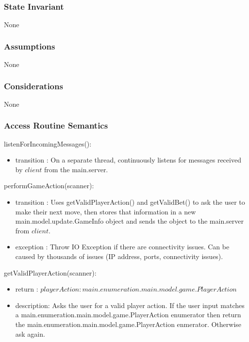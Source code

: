 \documentclass[12pt, titlepage]{article}
\begin{document}
    \subsubsection* {State Invariant}
        None
    
    \subsubsection* {Assumptions}
        None
    
    \subsubsection* {Considerations}
        None
    
    \subsubsection* {Access Routine Semantics}
    
        \noindent listenForIncomingMessages():
        \begin{itemize}
        \item transition : On a separate thread, continuously listens for messages received by $\mathit{client}$ from the main.server.
        \end{itemize}
        
        \noindent performGameAction(scanner):
        \begin{itemize}
        \item transition : Uses getValidPlayerAction() and getValidBet() to ask the user to make their next move, then stores that information in a new main.model.update.GameInfo object and sends the object to the main.server from $client$.
        \item exception : Throw IO Exception if there are connectivity issues. Can be caused by thousands of issues (IP address, ports, connectivity issues).
        \end{itemize}
        
        \noindent getValidPlayerAction(scanner):
        \begin{itemize}
        \item return : $playerAction : main.enumeration.main.model.game.PlayerAction$
        \item description: Asks the user for a valid player action. If the user input matches a main.enumeration.main.model.game.PlayerAction enumerator then return the main.enumeration.main.model.game.PlayerAction enmerator. Otherwise ask again.
        \end{itemize}
        
\end{document}
